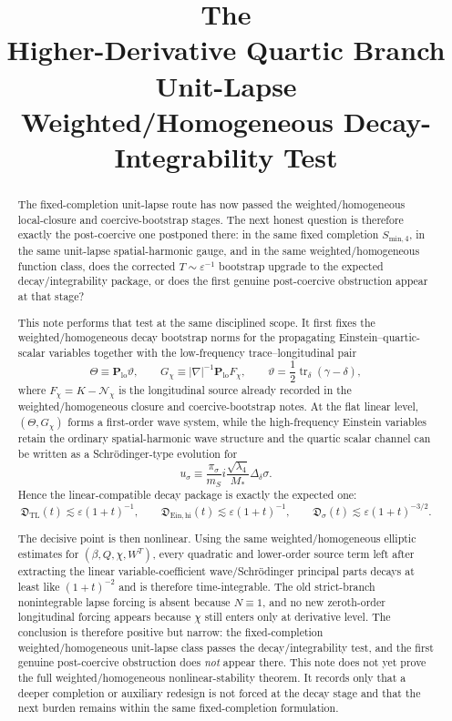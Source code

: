 \documentclass[11pt]{article}
\title{\textbf{The \TheoryName{}}\\[0.4em]
\large Higher-Derivative Quartic Branch Unit-Lapse Weighted/Homogeneous Decay-Integrability Test}
\author{}
\date{}
\begin{document}
\maketitle

\begin{abstract}
The fixed-completion unit-lapse route has now passed the weighted/homogeneous local-closure and coercive-bootstrap stages. The next honest question is therefore exactly the post-coercive one postponed there: in the same fixed completion \(S_{\mathrm{min},4}\), in the same unit-lapse spatial-harmonic gauge, and in the same weighted/homogeneous function class, does the corrected \(T\sim \varepsilon^{-1}\) bootstrap upgrade to the expected decay/integrability package, or does the first genuine post-coercive obstruction appear at that stage?

This note performs that test at the same disciplined scope. It first fixes the weighted/homogeneous decay bootstrap norms for the propagating Einstein--quartic-scalar variables together with the low-frequency trace--longitudinal pair
\[
\Theta \equiv \mathbf P_{\mathrm{lo}}\vartheta,
\qquad
G_\chi \equiv |\nabla|^{-1}\mathbf P_{\mathrm{lo}}F_\chi,
\qquad
\vartheta = \frac12\operatorname{tr}_\delta(\gamma-\delta),
\]
where \(F_\chi = K-\mathcal N_\chi\) is the longitudinal source already recorded in the weighted/homogeneous closure and coercive-bootstrap notes. At the flat linear level, \((\Theta,G_\chi)\) forms a first-order wave system, while the high-frequency Einstein variables retain the ordinary spatial-harmonic wave structure and the quartic scalar channel can be written as a Schr\"odinger-type evolution for
\[
u_\sigma
\equiv
\frac{\pi_\sigma}{m_S}
i\frac{\sqrt{\lambda_4}}{M_*}\Delta_\delta\sigma.
\]
Hence the linear-compatible decay package is exactly the expected one:
\[
\mathfrak D_{\mathrm{TL}}(t)\lesssim \varepsilon (1+t)^{-1},
\qquad
\mathfrak D_{\mathrm{Ein,hi}}(t)\lesssim \varepsilon (1+t)^{-1},
\qquad
\mathfrak D_\sigma(t)\lesssim \varepsilon (1+t)^{-3/2}.
\]

The decisive point is then nonlinear. Using the same weighted/homogeneous elliptic estimates for \((\beta,Q,\chi,W^T)\), every quadratic and lower-order source term left after extracting the linear variable-coefficient wave/Schr\"odinger principal parts decays at least like \((1+t)^{-2}\) and is therefore time-integrable. The old strict-branch nonintegrable lapse forcing is absent because \(N\equiv 1\), and no new zeroth-order longitudinal forcing appears because \(\chi\) still enters only at derivative level. The conclusion is therefore positive but narrow: the fixed-completion weighted/homogeneous unit-lapse class passes the decay/integrability test, and the first genuine post-coercive obstruction does \emph{not} appear there. This note does not yet prove the full weighted/homogeneous nonlinear-stability theorem. It records only that a deeper completion or auxiliary redesign is not forced at the decay stage and that the next burden remains within the same fixed-completion formulation.
\end{abstract}
\end{document}
